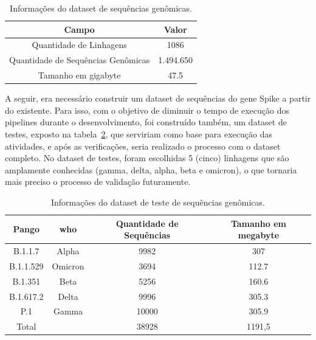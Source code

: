 \begin{table}[htb]
  \caption{Informações do dataset de sequências genômicas.}
  \begin{center}
    \begin{tabular}{c|c}
      \hline
      Campo                              & Valor     \\
      \hline
      Quantidade de Linhagens            & 1086      \\
      Quantidade de Sequências Genômicas & 1.494.650 \\
      Tamanho em \gls{gigabyte}          & 47.5      \\
      \hline
    \end{tabular}
  \end{center}
  \label{tab:datasetGenomas}
\end{table}

A seguir, era necessário construir um dataset de sequências do gene Spike a partir do existente. Para isso, com o objetivo de diminuir o tempo de execução dos pipelines durante o desenvolvimento, foi construído também, um dataset de testes, exposto na tabela~\ref{tab:datasetGenomasTeste}, que serviriam como base para execução das atividades, e após as verificações, seria realizado o processo com o dataset completo. No dataset de testes, foram escolhidas 5 (cinco) linhagens que são amplamente conhecidas (gamma, delta, alpha, beta e omicron), o que tornaria mais preciso o processo de validação futuramente.

\begin{table}[htb]
  \caption{Informações do dataset de teste de sequências genômicas.}
  \begin{center}
    \begin{tabular}{c|c|c|c}
      \hline
      Pango     & \gls{who} & Quantidade de Sequências & Tamanho em \gls{megabyte} \\
      \hline
      B.1.1.7   & Alpha     & 9982                     & 307                       \\
      B.1.1.529 & Omicron   & 3694                     & 112.7                     \\
      B.1.351   & Beta      & 5256                     & 160.6                     \\
      B.1.617.2 & Delta     & 9996                     & 305.3                     \\
      P.1       & Gamma     & 10000                    & 305.9                     \\
      \hline
      Total     &           & 38928                    & 1191,5                    \\
      \hline
    \end{tabular}
  \end{center}
  \label{tab:datasetGenomasTeste}
\end{table}

